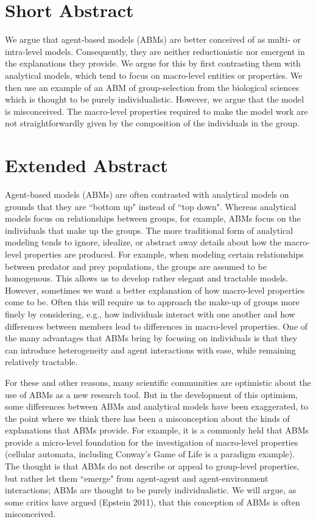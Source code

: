 \documentclass[11pt]{article}
\begin{document}
\section*{Short Abstract}

We argue that agent-based models (ABMs) are better conceived of as multi- or intra-level models. Consequently, they are neither reductionistic nor emergent in the explanations they provide. We argue for this by first contrasting them with analytical models, which tend to focus on macro-level entities or properties. We then use an example of an ABM of group-selection from the biological sciences which is thought to be purely individualistic. However, we argue that the model is misconceived. The macro-level properties required to make the model work are not straightforwardly  given by the composition of the individuals in the group.

\section*{Extended Abstract}


Agent-based models (ABMs) are often contrasted with analytical models on grounds that they are ``bottom up" instead of ``top down". Whereas analytical models focus on relationships between groups, for example, ABMs focus on the individuals that make up the groups. The more traditional form of analytical modeling tends to ignore, idealize, or abstract away details about how the macro-level properties are produced. For example, when modeling certain relationships between predator and prey populations, the groups are assumed to be homogenous.  This allows us to develop rather elegant and tractable models. However, sometimes we want a better explanation of how macro-level properties come to be. Often this will require us to approach the make-up of groups more finely by considering, e.g., how individuals interact with one another and how differences between members lead to differences in macro-level properties. One of the many advantages that ABMs bring by focusing on individuals is that they can introduce heterogeneity and agent interactions with ease, while remaining relatively tractable.

For these and other reasons, many scientific communities are optimistic about the use of ABMs as a new research tool.  But in the development of this optimism, some differences between ABMs and analytical models have been exaggerated, to the point where we think there has been a misconception about the kinds of explanations that ABMs provide. For example, it is a commonly held that ABMs provide a micro-level foundation for the investigation of macro-level properties (cellular automata, including Conway's Game of Life is a paradigm example).  The thought is that ABMs do not describe or appeal to group-level properties, but rather let them ``emerge" from agent-agent and agent-environment interactions; ABMs are thought to be purely individualistic. We will argue, as some critics have argued (Epstein 2011), that this conception of ABMs is often misconceived.
\end{document}
